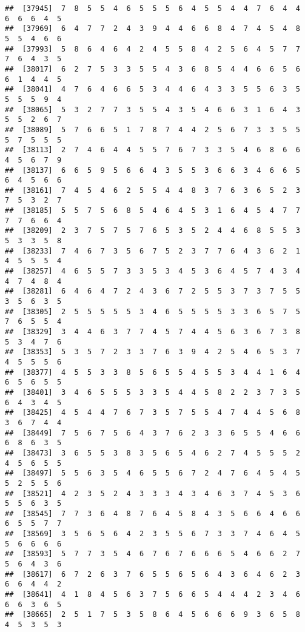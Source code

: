 \documentclass[
]{book}
\begin{document}
\begin{verbatim}
##  [37945]  7  8  5  5  4  6  5  5  5  6  4  5  5  4  4  7  6  4  4  6  6  6  4  5
##  [37969]  6  4  7  7  2  4  3  9  4  4  6  6  8  4  7  4  5  4  8  5  5  4  6  6
##  [37993]  5  8  6  4  6  4  2  4  5  5  8  4  2  5  6  4  5  7  7  7  6  4  3  5
##  [38017]  6  2  7  5  3  3  5  5  4  3  6  8  5  4  4  6  6  5  6  6  1  4  4  5
##  [38041]  4  7  6  4  6  6  5  3  4  4  6  4  3  3  5  5  6  3  5  5  5  5  9  4
##  [38065]  5  3  2  7  7  3  5  5  4  3  5  4  6  6  3  1  6  4  3  5  5  2  6  7
##  [38089]  5  7  6  6  5  1  7  8  7  4  4  2  5  6  7  3  3  5  5  5  7  5  5  5
##  [38113]  2  7  4  6  4  4  5  5  7  6  7  3  3  5  4  6  8  6  6  4  5  6  7  9
##  [38137]  6  6  5  9  5  6  6  4  3  5  5  3  6  6  3  4  6  6  5  6  4  5  6  6
##  [38161]  7  4  5  4  6  2  5  5  4  4  8  3  7  6  3  6  5  2  3  7  5  3  2  7
##  [38185]  5  5  7  5  6  8  5  4  6  4  5  3  1  6  4  5  4  7  7  7  7  6  6  4
##  [38209]  2  3  7  5  7  5  7  6  5  3  5  2  4  4  6  8  5  5  3  5  3  3  5  8
##  [38233]  7  4  6  7  3  5  6  7  5  2  3  7  7  6  4  3  6  2  1  4  5  5  5  4
##  [38257]  4  6  5  5  7  3  3  5  3  4  5  3  6  4  5  7  4  3  4  4  7  4  8  4
##  [38281]  6  4  6  4  7  2  4  3  6  7  2  5  5  3  7  3  7  5  5  3  5  6  3  5
##  [38305]  2  5  5  5  5  5  3  4  6  5  5  5  5  3  3  6  5  7  5  7  6  5  5  4
##  [38329]  3  4  4  6  3  7  7  4  5  7  4  4  5  6  3  6  7  3  8  5  3  4  7  6
##  [38353]  5  3  5  7  2  3  3  7  6  3  9  4  2  5  4  6  5  3  7  4  5  5  5  6
##  [38377]  4  5  5  3  3  8  5  6  5  5  4  5  5  3  4  4  1  6  4  6  5  6  5  5
##  [38401]  3  4  6  5  5  5  3  3  5  4  4  5  8  2  2  3  7  3  5  6  4  3  4  5
##  [38425]  4  5  4  4  7  6  7  3  5  7  5  5  4  7  4  4  5  6  8  3  6  7  4  4
##  [38449]  7  5  6  7  5  6  4  3  7  6  2  3  3  6  5  5  4  6  6  6  8  6  3  5
##  [38473]  3  6  5  5  3  8  3  5  6  5  4  6  2  7  4  5  5  5  2  4  5  6  5  5
##  [38497]  5  5  6  3  5  4  6  5  5  6  7  2  4  7  6  4  5  4  5  5  2  5  5  6
##  [38521]  4  2  3  5  2  4  3  3  3  4  3  4  6  3  7  4  5  3  6  5  5  6  3  5
##  [38545]  7  7  3  6  4  8  7  6  4  5  8  4  3  5  6  6  4  6  6  6  5  5  7  7
##  [38569]  3  5  6  5  6  4  2  3  5  5  6  7  3  3  7  4  6  4  5  5  6  6  6  6
##  [38593]  5  7  7  3  5  4  6  7  6  7  6  6  6  5  4  6  6  2  7  5  6  4  3  6
##  [38617]  6  7  2  6  3  7  6  5  5  6  5  6  4  3  6  4  6  2  3  6  6  4  4  2
##  [38641]  4  1  8  4  5  6  3  7  5  6  6  5  4  4  4  2  3  4  6  6  6  3  6  5
##  [38665]  2  5  1  7  5  3  5  8  6  4  5  6  6  6  9  3  6  5  8  4  5  3  5  3

\end{verbatim}
\end{document}
